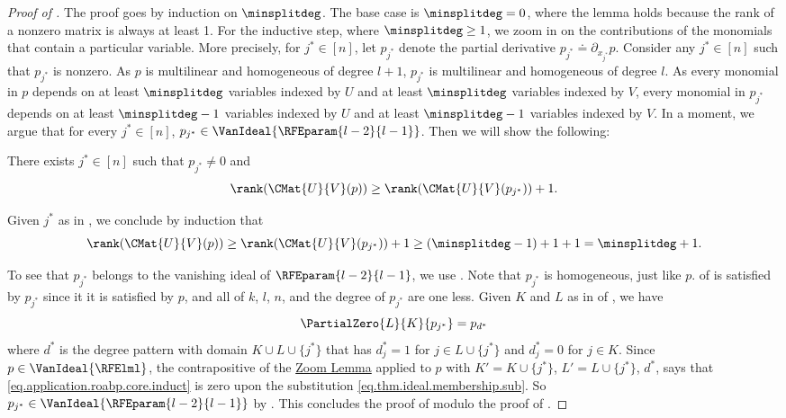 \documentclass{toc}
\begin{document}
\begin{proof}[Proof of ]
  The proof goes by induction on \(\minsplitdeg\).
  The base case is \(\minsplitdeg = 0\), where the lemma holds because the rank of a nonzero matrix is always at least 1.
  For the inductive step, where \(\minsplitdeg \ge 1\), we zoom in on the contributions of the monomials that contain a particular variable. More precisely, for $j^* \in [n]$,
  let $p_{j^*}$ denote the partial derivative $p_{j^*} \doteq \partial_{x_{j^*}} p$.
  Consider any $j^* \in [n]$ such that $p_{j^*}$ is nonzero.
  As $p$ is multilinear and homogeneous of degree $l+1$,
  \(p_{j^*}\) is multilinear and homogeneous of degree \(l\). As every monomial in $p$ depends on at least $\minsplitdeg$ variables indexed by \(U\) and at least \(\minsplitdeg\) variables indexed by \(V\), every monomial in \(p_{j^*}\) depends on at least \(\minsplitdeg-1\) variables indexed by \(U\) and at least \(\minsplitdeg-1\) variables indexed by \(V\).
  In a moment, we argue that for every \(j^* \in [n]\),
  \(p_{j^*}\in\VanIdeal{\RFEparam{l-2}{l-1}}\).
  Then we will show the following:
  \begin{claim}\label{claim.existence}
    There exists $j^* \in [n]$ such that $p_{j^*} \ne 0$ and
    \begin{equation} \label{eq.claim.application.roabp.core}
      \rank(\CMat{U}{V}(p)) \ge \rank(\CMat{U}{V}(p_{j^*})) + 1.
    \end{equation}
  \end{claim}
  Given \(j^*\) as in ,
  we conclude by induction that
  \[
    \rank(\CMat{U}{V}(p))
    \ge \rank(\CMat{U}{V}(p_{j^*})) + 1
    \ge (\minsplitdeg-1) + 1 + 1
    = \minsplitdeg + 1.
  \]

  To see that \(p_{j^*}\) belongs to the vanishing ideal of
  \(\RFEparam{l-2}{l-1}\),
  we use . Note that \(p_{j^*}\) is homogeneous, just like $p$.
   of
   is satisfied by \(p_{j^*}\)
  since it it is satisfied by \(p\),
  and all of $k$, $l$, $n$, and the degree of $p_{j^*}$ are one less.
  Given \(K\) and \(L\) as in
   of
  ,
  we have
  \begin{equation}\label{eq.application.roabp.core.induct}
    \PartialZero{L}{K}{p_{j^*}}
    =
    p_{d^*}
  \end{equation}
  where \(d^*\) is the degree pattern with domain \(K \cup L \cup \{j^*\}\)
  that has \(d^*_j = 1\) for \(j \in L\cup\{j^*\}\)
  and \(d^*_j = 0\) for \(j \in K\).
  Since \(p \in \VanIdeal{\RFElml}\),
  the contrapositive of the \hyperref[lem.multi-zsub-deriv]{Zoom Lemma} applied to \(p\) with
  \(K'=K\cup\{j^*\}\),
  \(L'=L\cup\{j^*\}\),
  \(d^*\),
  says that \eqref{eq.application.roabp.core.induct} is zero upon the substitution 
  \eqref{eq.thm.ideal.membership.sub}.
  So \(p_{j^*}\in\VanIdeal{\RFEparam{l-2}{l-1}}\) by
  .
  This concludes the proof of  modulo the proof of .
  \end{proof}
\end{document}

